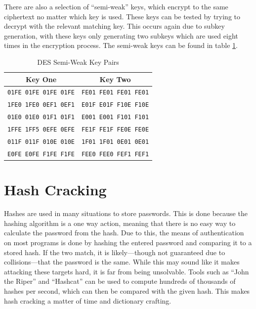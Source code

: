 				There are also a selection of ``semi-weak'' keys, which encrypt to the same ciphertext no matter which key is used.
				These keys can be tested by trying to decrypt with the relevant matching key.
				This occurs again due to subkey generation, with these keys only generating two subkeys which are used eight times in the encryption process.
				The semi-weak keys can be found in table \ref{tab:DESSemiWeakKeys}.
				\begin{table}[htb]
					\centering
					\begin{tabular}{cc}
						\toprule
						\textbf{Key One} & \textbf{Key Two} \\
						\toprule
						\texttt{01FE 01FE 01FE 01FE} & \texttt{FE01 FE01 FE01 FE01} \\
						\texttt{1FE0 1FE0 0EF1 0EF1} & \texttt{E01F E01F F10E F10E} \\
						\texttt{01E0 01E0 01F1 01F1} & \texttt{E001 E001 F101 F101} \\
						\texttt{1FFE 1FF5 0EFE 0EFE} & \texttt{FE1F FE1F FE0E FE0E} \\
						\texttt{011F 011F 010E 010E} & \texttt{1F01 1F01 0E01 0E01} \\
						\texttt{E0FE E0FE F1FE F1FE} & \texttt{FEE0 FEE0 FEF1 FEF1} \\
						\bottomrule
					\end{tabular}
					\caption{DES Semi-Weak Key Pairs}
					\label{tab:DESSemiWeakKeys}
				\end{table}

	\section{Hash Cracking}
		Hashes are used in many situations to store passwords.
		This is done because the hashing algorithm is a one way action, meaning that there is no easy way to calculate the password from the hash.
		Due to this, the means of authentication on most programs is done by hashing the entered password and comparing it to a stored hash.
		If the two match, it is likely---though not guaranteed due to collisions---that the password is the same.
		While this may sound like it makes attacking these targets hard, it is far from being unsolvable.
		Tools such as ``John the Riper'' and ``Hashcat'' can be used to compute hundreds of thousands of hashes per second, which can then be compared with the given hash.
		This makes hash cracking a matter of time and dictionary crafting.
